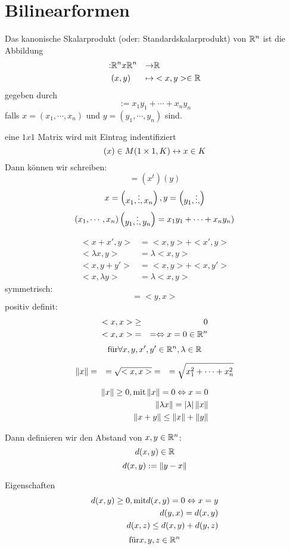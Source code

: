 \section{Bilinearformen}
Das kanonische Skalarprodukt (oder: Standardskalarprodukt) von $\mathbb{R}^n$ ist die Abbildung
\begin{align*}<,>: & \mb{R}^nx\mb{R}^n & \to & \mb{R}\\
 & (x,y) & \mapsto & <x,y>\in\mb{R}
\end{align*}
gegeben durch
\[<x,y>:=x_1y_1+\cdots+x_ny_n\]
falls $x=(x_1,\cdots,x_n)$ und $y=(y_1,\cdots,y_n)$ sind.
\begin{Def}[Konvention]
eine $1x1$ Matrix wird mit Eintrag indentifiziert
\[(x)\in{}M(1\times 1,K) \leftrightarrow x\in{}K\]
Dann können wir schreiben:
\[<x,y>=(x^t)(y)\]
\[x=\begin{pmatrix}x_1,\vdots,x_n\end{pmatrix}, y=\begin{pmatrix}y_1,\vdots,\end{pmatrix}\]
\[(x_1,\cdots,x_n)\begin{pmatrix}y_1,\vdots,y_n\end{pmatrix}=x_1y_1+\cdots+x_ny_n)\]
\end{Def}
\begin{Bem}
\begin{align*}
  <x+x',y>&=<x,y>+<x',y>\\
  <\lambda{}x,y>&=\lambda<x,y>\\
  <x,y+y'>&=<x,y>+<x,y'>\\
  <x,\lambda{}y>&=\lambda<x,y>
\end{align*}
symmetrisch:
\[<x,y>=<y,x>\]
positiv definit:
\begin{align*}
  <x,x> &\geq& 0 \\
  <x,x> &=&= \Leftrightarrow x=0\in\mathbb{R}^n
\end{align*}
\[\text{für} \forall x,y,x',y'\in\mathbb{R}^n, \lambda\in\mathbb{R}\]
\end{Bem}
\begin{Bem}
\begin{align*}
  \left\| x \right\|&=&=\sqrt{<x,x>}
  &=&=\sqrt{x^2_1+\cdots+x_n^2}
\end{align*}
\end{Bem}
\begin{Bem}
\begin{align*}
  \left\| x \right\|\geq0, \text{mit} \left\| x \right\|=0 \Leftrightarrow x=0\\
  \left\| \lambda{}x \right\|=\left| \lambda \right|\left\| x \right\|\\
  \left\| x+y \right\|\leq\left\| x \right\|+\left\| y \right\|
\end{align*}
\end{Bem}
Dann definieren wir den Abstand von $x,y\in\mathbb{R}^n$:
\[d(x,y)\in\mathbb{R}\]
\[d(x,y):=\left\| y-x \right\|\]
\begin{Bem}{Eigenschaften}
\begin{align*}
  d(x,y)\geq0, \text{mit}d(x,y)=0 \Leftrightarrow x=y\\
  d(y,x)=d(x,y)\\
  d(x,z)\leq d(x,y)+d(y,z)
\end{align*}
\[\text{für} x,y,z\in\mathbb{R}^n\]
\end{Bem}
